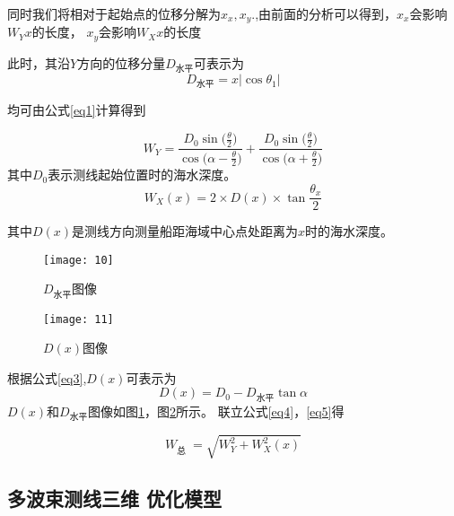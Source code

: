 \documentclass[11pt,twoside,a4paper]{article}
\begin{document}
同时我们将相对于起始点的位移分解为$x_{x},x_{y}$.,由前面的分析可以得到，$x_{x}$会影响$W_Y{x}$的长度，
$x_{y}$会影响$W_X{x}$的长度

此时，其沿$Y$方向的位移分量$D_\text{水平}$可表示为
\begin{equation}
	D_\text{水平}=x |\cos \theta_1|
	\label{eq3}
\end{equation}



均可由公式\ref{eq1}计算得到

 \begin{equation}
	W_Y=\frac{D_0 \sin{(\frac{\theta}{2}})}{\cos{(\alpha-\frac{\theta}{2}})}+\frac{D_0 \sin{(\frac{\theta}{2}})}{\cos{(\alpha+\frac{\theta}{2}})}
	\label{eq4}
\end{equation}
其中$D_0$表示测线起始位置时的海水深度。
\begin{equation}
	W_X(x)=2 \times D(x)\times \tan{\frac{\theta_x}{2}}
\end{equation}


 其中$D(x)$是测线方向测量船距海域中心点处距离为$x$时的海水深度。

 \begin{figure}[h]
	\centering
	\texttt{[image: 10]}
	\caption{$D_\text{水平}$图像}
	\label{8}
\end{figure}


\begin{figure}[h]
	\centering
	\texttt{[image: 11]}
	\caption{$D(x)$图像}
	\label{9}
\end{figure}
根据公式\ref{eq3},$D(x)$可表示为
 \begin{equation}
	D(x)=D_0-D_\text{水平}\tan{\alpha}
	\label{eq5}
\end{equation}
$D(x)$和$D_\text{水平}$图像如图\ref{8}，图\ref{9}所示。
联立公式\ref{eq4}，\ref{eq5}得

	
\begin{equation}
	W_{\text {总 }}=\sqrt{W_Y^2+W_X^2(x)}
\end{equation}

\subsection{多波束测线三维 优化模型}
\end{document}
